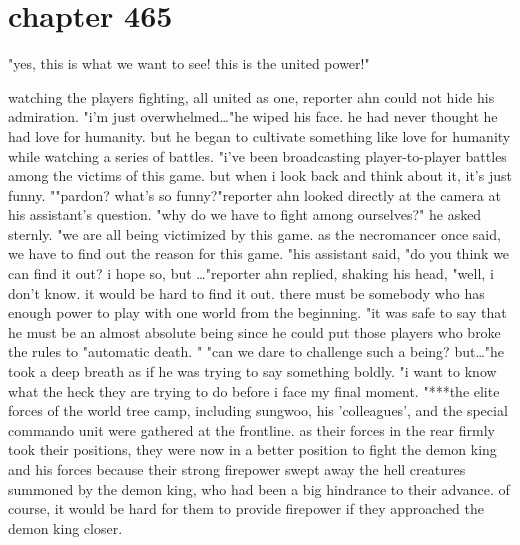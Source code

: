 \section{chapter 465}

"yes, this is what we want to see! this is the united power!"




watching the players fighting, all united as one, reporter ahn could not hide his admiration.
 "i'm just overwhelmed…"he wiped his face.
 he had never thought he had love for humanity.
 but he began to cultivate something like love for humanity while watching a series of battles.
 "i've been broadcasting player-to-player battles among the victims of this game.
 but when i look back and think about it, it's just funny.
""pardon? what's so funny?"reporter ahn looked directly at the camera at his assistant's question.
"why do we have to fight among ourselves?" he asked sternly.
 "we are all being victimized by this game.
 as the necromancer once said, we have to find out the reason for this game.
"his assistant said, "do you think we can find it out? i hope so, but …"reporter ahn replied, shaking his head, "well, i don't know.
 it would be hard to find it out.
 there must be somebody who has enough power to play with one world from the beginning.
"it was safe to say that he must be an almost absolute being since he could put those players who broke the rules to "automatic death.
" "can we dare to challenge such a being? but…"he took a deep breath as if he was trying to say something boldly.
 "i want to know what the heck they are trying to do before i face my final moment.
"***the elite forces of the world tree camp, including sungwoo, his 'colleagues', and the special commando unit were gathered at the frontline.
 as their forces in the rear firmly took their positions, they were now in a better position to fight the demon king and his forces because their strong firepower swept away the hell creatures summoned by the demon king, who had been a big hindrance to their advance.
of course, it would be hard for them to provide firepower if they approached the demon king closer.

